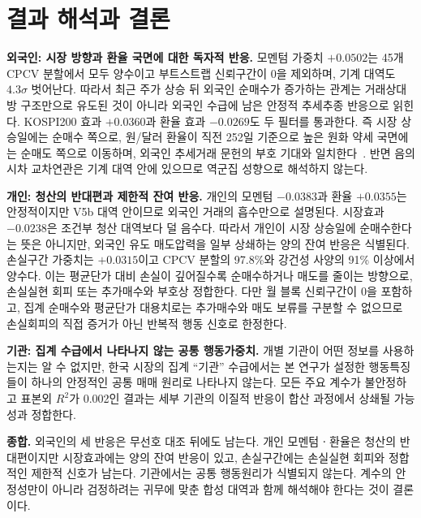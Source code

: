 \section{결과 해석과 결론}
\label{sec:interpretation}

\textbf{외국인: 시장 방향과 환율 국면에 대한 독자적 반응.} 모멘텀 가중치
$+0.0502$는 45개 CPCV 분할에서 모두 양수이고 부트스트랩 신뢰구간이 0을 제외하며,
기계 대역도 $4.3\sigma$ 벗어난다. 따라서 최근 주가 상승 뒤 외국인 순매수가 증가하는
관계는 거래상대방 구조만으로 유도된 것이 아니라 외국인 수급에 남은 안정적 추세추종
반응으로 읽힌다. KOSPI200 효과 $+0.0360$과 환율 효과 $-0.0269$도 두 필터를 통과한다.
즉 시장 상승일에는 순매수 쪽으로, 원/달러 환율이 직전 252일 기준으로 높은 원화 약세
국면에는 순매도 쪽으로 이동하며, 외국인 추세거래 문헌의 부호 기대와
일치한다~\cite{grinblatt2000investment,choe1999foreign}. 반면 음의 시차 교차연관은
기계 대역 안에 있으므로 역군집 성향으로 해석하지 않는다.

\textbf{개인: 청산의 반대편과 제한적 잔여 반응.} 개인의 모멘텀 $-0.0383$과 환율
$+0.0355$는 안정적이지만 V5b 대역 안이므로 외국인 거래의 흡수만으로 설명된다. 시장효과
$-0.0238$은 조건부 청산 대역보다 덜 음수다. 따라서 개인이 시장 상승일에 순매수한다는
뜻은 아니지만, 외국인 유도 매도압력을 일부 상쇄하는 양의 잔여 반응은 식별된다. 손실구간
가중치는 $+0.0315$이고 CPCV 분할의 97.8\%와 강건성 사양의 91\% 이상에서 양수다.
이는 평균단가 대비 손실이 깊어질수록 순매수하거나 매도를 줄이는 방향으로, 손실실현 회피
또는 추가매수와 부호상 정합한다. 다만 월 블록 신뢰구간이 0을 포함하고, 집계 순매수와
평균단가 대용치로는 추가매수와 매도 보류를 구분할 수 없으므로 손실회피의 직접 증거가
아닌 반복적 행동 신호로 한정한다.

\textbf{기관: 집계 수급에서 나타나지 않는 공통 행동가중치.} 개별 기관이 어떤 정보를
사용하는지는 알 수 없지만, 한국 시장의 집계 ``기관'' 수급에서는 본 연구가 설정한
행동특징들이 하나의 안정적인 공통 매매 원리로 나타나지 않는다. 모든 주요 계수가
불안정하고 표본외 $R^2$가 0.002인 결과는 세부 기관의 이질적 반응이 합산 과정에서
상쇄될 가능성과 정합한다.

\textbf{종합.} 외국인의 세 반응은 무선호 대조 뒤에도 남는다. 개인 모멘텀ㆍ환율은 청산의
반대편이지만 시장효과에는 양의 잔여 반응이 있고, 손실구간에는 손실실현 회피와 정합적인
제한적 신호가 남는다. 기관에서는 공통 행동원리가 식별되지 않는다. 계수의 안정성만이
아니라 검정하려는 귀무에 맞춘 합성 대역과 함께 해석해야 한다는 것이 결론이다.

